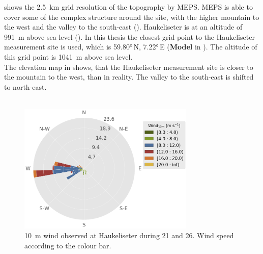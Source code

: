  shows the \SI{2.5}{\km} grid resolution of the topography by MEPS.  
MEPS is able to cover some of the complex structure around the site, with the higher mountain to the west and the valley to the south-east (). Haukeliseter is at an altitude of \SI{991}{\metre} above sea level (). In this thesis the closest grid point to the Haukeliseter measurement site is used, which is \ang{59.80}\,N, \ang{7.22}\,E (\textbf{Model} in ). The altitude of this grid point is \SI{1041}{\metre} above sea level.
\\
The elevation map in  shows, that the Haukeliseter measurement site is closer to the mountain to the west, than in reality. The valley to the south-east is shifted to north-east. 
\\
\\
\begin{figure}[ht!]
	\centering
	\includegraphics[width=0.75\textwidth]{./fig_windrose/20161221_26}
	\caption{\SI{10}{\metre} wind observed at Haukeliseter during \num{21} and \SI{26}{\dec}. Wind speed according to the colour bar.}\label{fig:windrose}
\end{figure}
